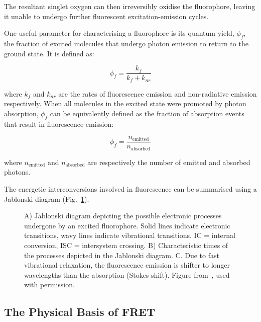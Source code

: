 The resultant singlet oxygen can then irreversibly oxidise the fluorophore, leaving it unable to undergo further fluorescent excitation-emission cycles.   


One useful parameter for characterising a fluorophore is its quantum yield, $\phi_f$, the fraction of excited molecules that undergo photon emission to return to the ground state. It is defined as: 

\begin{equation}
\phi_f = \frac{k_f}{k_f + k_{nr}}
\label{eq:quantum_yield}
\end{equation}

where $k_f$ and $k_{nr}$ are the rates of fluorescence emission and non-radiative emission respectively. When all molecules in the excited state were promoted by photon absorption, $\phi_f$ can be equivalently defined as the fraction of absorption events that result in fluorescence emission: 


\begin{equation}
\phi_f = \frac{n_{\text{emitted}}}{n_{\text{absorbed}}}
\label{eq:quantum_yield_ratio}
\end{equation}

where $n_{\text{emitted}}$ and $n_{\text{absorbed}}$ are respectively the number of emitted and absorbed photons.

The energetic interconversions involved in fluorescence can be summarised using a Jablonski diagram (Fig.~\ref{fig:jablonski}).

\begin{figure}[!ht]
   \begin{center}
      \caption{A) Jablonski diagram depicting the possible electronic processes undergone by an excited fluorophore. Solid lines indicate electronic transitions, wavy lines indicate vibrational transitions. IC = internal conversion, ISC = intersystem crossing. B) Characteristic times of the processes depicted in the Jablonski diagram. C. Due to fast vibrational relaxation, the fluorescence emission is shifter to longer wavelengths than the absorption (Stokes shift). Figure from~\cite{Horrocks2014}, used with permission.}
      \label{fig:jablonski}
   \end{center}
\end{figure}

\subsection{The Physical Basis of FRET}
\label{sect:fret}
